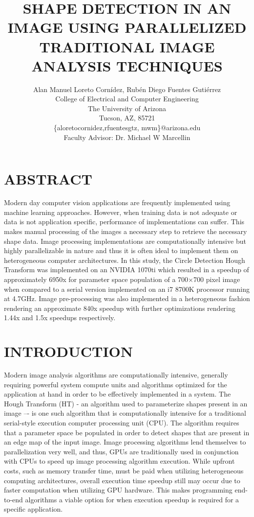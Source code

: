 \documentclass[12pt]{article}
\title{\Large \vspace{-0.5in}
\MakeUppercase{Shape Detection in an Image using Parallelized Traditional Image Analysis Techniques}}
\author{ Alan Manuel Loreto Cornídez, Rubén Diego Fuentes Gutiérrez\\
    \normalsize College of Electrical and Computer Engineering\\
    \normalsize The University of Arizona\\ 
    \normalsize Tucson, AZ, 85721\\
    \normalsize \{aloretocornidez,rfuentesgtz, mwm\}@arizona.edu\\[6pt]
    Faculty Advisor: Dr. Michael W Marcellin
  }
\date{}
\begin{document}
\maketitle


\section{\MakeUppercase{Abstract}}

\noindent
Modern day computer vision applications are frequently implemented using machine learning approaches.
However, when training data is not adequate or data is not application specific, performance of implementations can suffer.
This makes manual processing of the images a necessary step to retrieve the necessary shape data.
Image processing implementations are computationally intensive but highly parallelizable in nature and thus it is often ideal to implement them on heterogeneous computer architectures.
In this study, the Circle Detection Hough Transform was implemented on an NVIDIA 1070ti which resulted in a speedup of approximately 6950x for parameter space population of a 700$\times$700 pixel image when compared to a serial version implemented on an i7 8700K processor running at 4.7GHz.
Image pre-processing was also implemented in a heterogeneous fashion rendering an approximate 840x speedup with further optimizations rendering 1.44x and 1.5x speedups respectively. 


\section{\MakeUppercase{Introduction}}

\noindent
Modern image analysis algorithms are computationally intensive, generally requiring powerful system compute units and algorithms optimized for the application at hand in order to be effectively implemented in a system. 
The Hough Transform (HT)\cite{BALLARD1981111} - an algorithm used to parameterize shapes present in an image –- is one such algorithm that is computationally intensive for a traditional serial-style execution computer processing unit (CPU).
The algorithm requires that a parameter space be populated in order to detect shapes that are present in an edge map of the input image.
Image processing algorithms lend themselves to parallelization very well, and thus, GPUs are traditionally used in conjunction with CPUs to speed up image processing algorithm execution.
While upfront costs, such as memory transfer time, must be paid when utilizing heterogeneous computing architectures, overall execution time speedup still may occur due to faster computation when utilizing GPU hardware.
This makes programming end-to-end algorithms a viable option for when execution speedup is required for a specific application.
\end{document}
